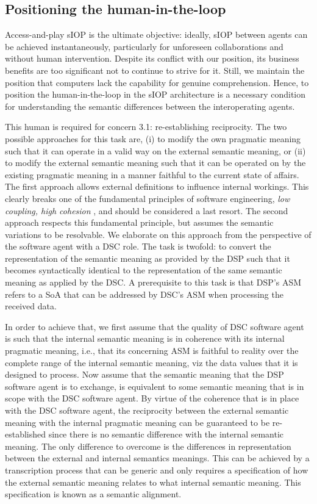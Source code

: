 \documentclass[sort&compress,preprint,authoryear,3p,twocolumn]{elsarticle}
\begin{document}
\hypertarget{positioning-the-human-in-the-loop}{%
\subsection{Positioning the
human-in-the-loop}\label{positioning-the-human-in-the-loop}}

Access-and-play sIOP is the ultimate objective: ideally, sIOP between
agents can be achieved instantaneously, particularly for unforeseen
collaborations and without human intervention. Despite its conflict with
our position, its business benefits are too significant not to continue
to strive for it. Still, we maintain the position that computers lack
the capability for genuine comprehension. Hence, to position the
human-in-the-loop in the sIOP architecture is a necessary condition for
understanding the semantic differences between the interoperating
agents.

This human is required for concern 3.1: re-establishing reciprocity. The
two possible approaches for this task are, (i) to modify the own
pragmatic meaning such that it can operate in a valid way on the
external semantic meaning, or (ii) to modify the external semantic
meaning such that it can be operated on by the existing pragmatic
meaning in a manner faithful to the current state of affairs. The first
approach allows external definitions to influence internal workings.
This clearly breaks one of the fundamental principles of software
engineering, \emph{low coupling, high cohesion}
\citep[e.g.,][]{Hitz1995}, and should be considered a last resort. The
second approach respects this fundamental principle, but assumes the
semantic variations to be resolvable. We elaborate on this approach from
the perspective of the software agent with a DSC role. The task is
twofold: to convert the representation of the semantic meaning as
provided by the DSP such that it becomes syntactically identical to the
representation of the same semantic meaning as applied by the DSC. A
prerequisite to this task is that DSP's ASM refers to a SoA that can be
addressed by DSC's ASM when processing the received data.

In order to achieve that, we first assume that the quality of DSC
software agent is such that the internal semantic meaning is in
coherence with its internal pragmatic meaning, i.e., that its concerning
ASM is faithful to reality over the complete range of the internal
semantic meaning, viz the data values that it is designed to process.
Now assume that the semantic meaning that the DSP software agent is to
exchange, is equivalent to some semantic meaning that is in scope with
the DSC software agent. By virtue of the coherence that is in place with
the DSC software agent, the reciprocity between the external semantic
meaning with the internal pragmatic meaning can be guaranteed to be
re-established since there is no semantic difference with the internal
semantic meaning. The only difference to overcome is the differences in
representation between the external and internal semantics meanings.
This can be achieved by a transcription process that can be generic and
only requires a specification of how the external semantic meaning
relates to what internal semantic meaning. This specification is known
as a semantic alignment.
\end{document}
